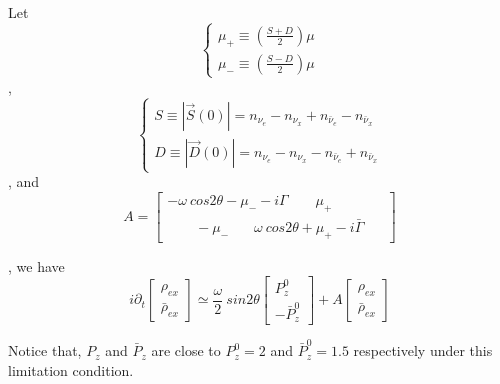 \documentclass[aps,prd,twocolumn,amsmath,amssymb,groupedaddress]{revtex4-2}
\begin{document}
Let
\begin{equation}
\begin{cases}
	\mu_+ \equiv \left(\frac{S+D}{2}\right) \mu
	\\
	\mu_- \equiv \left(\frac{S-D}{2}\right) \mu
\end{cases}
\end{equation}
, 
\begin{equation}
	\begin{cases}
		S \equiv |\vec{S}(0)| =  n_{\nu_e} - n_{\nu_x} + n_{\bar{\nu}_e} - n_{\bar{\nu}_x}
		\\
		D \equiv |\vec{D}(0)| =  n_{\nu_e} - n_{\nu_x} - n_{\bar{\nu}_e} + n_{\bar{\nu}_x}
	\end{cases}
\end{equation}, 
and
\begin{equation}
A = \begin{bmatrix}
	-\omega ~cos2\theta-\mu_--i\Gamma ~~~~~~~~~ \mu_+ ~~~~~~~~~~~~~~~~\\ ~~~~~~~~~ -\mu_- ~~~~~~~~ \omega ~cos2\theta+\mu_+-i\bar{\Gamma}
\end{bmatrix}
\end{equation}

, we have
\begin{equation}
	\label{equ:EOM_matrix}
	i \partial_t \begin{bmatrix}
		\rho_{ex} \\ \bar{\rho}_{ex}
	\end{bmatrix} \simeq
	\frac{\omega}{2} ~sin2\theta 
	\begin{bmatrix}
		P_{z}^0 \\ -\bar{P}_{z}^0
	\end{bmatrix} + A \begin{bmatrix}
		\rho_{ex} \\ \bar{\rho}_{ex}
	\end{bmatrix}
\end{equation}

Notice that, $P_{z}$ and $\bar{P}_{z}$ are close to $P_{z}^0 = 2$ and $\bar{P}_{z}^0 = 1.5$ respectively under this limitation condition.
\end{document}
